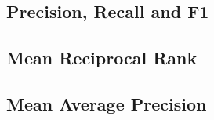 \subsection{Precision, Recall and F1}
\label{subsec:2_basics/2_metrics/2_prf}


\subsection{Mean Reciprocal Rank}
\label{subsec:2_basics/2_metrics/3_mrr}


\subsection{Mean Average Precision}
\label{subsec:2_basics/2_metrics/4_map}

